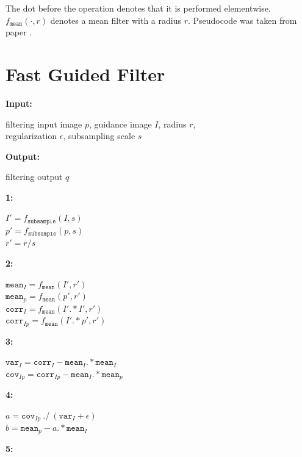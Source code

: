 \vspace{1em}
The dot before the operation denotes that it is performed elementwise. $f_\texttt{mean}(\cdot, r)$ denotes a mean filter with a radius $r$. Pseudocode was taken from paper \cite{gif}.
\newpage

\section{Fast Guided Filter}
\label{ax:gif_fast}
\begin{algorithmic}
    \State \textbf{Input:} \phantom{1}\parbox[t]{\dimexpr\linewidth-\algorithmicindent-7em}{
    filtering input image $p$, guidance image $I$, radius $r$,\\
    regularization $\epsilon$, subsampling scale $s$
    }
    \vspace{0.1em}
    \State \textbf{Output:} \phantom{1}\parbox[t]{\dimexpr\linewidth-\algorithmicindent-7em}{
    filtering output $q$
    }
    \vspace{0.1em}
    \State \textbf{1:} \phantom{1}\parbox[t]{\dimexpr\linewidth-\algorithmicindent-1em}{
    $I' = f_\texttt{subsample}(I, s)$ \\
    $p' = f_\texttt{subsample}(p, s)$ \\
    $r' = r/s$
    }
    \vspace{0.1em}
    \State \textbf{2:} \phantom{1}\parbox[t]{\dimexpr\linewidth-\algorithmicindent-1em}{
    $\texttt{mean}_{I} = f_\texttt{mean}(I', r')$ \\
    $\texttt{mean}_{p} = f_\texttt{mean}(p', r')$ \\
    $\texttt{corr}_{I} = f_\texttt{mean}(I' .* I', r')$ \\
    $\texttt{corr}_{Ip} = f_\texttt{mean}(I' .* p', r')$
    }
    \vspace{0.1em}
    \State \textbf{3:} \phantom{1}\parbox[t]{\dimexpr\linewidth-\algorithmicindent-1em}{
    $\texttt{var}_{I} = \texttt{corr}_{I} - \texttt{mean}_{I} .* \texttt{mean}_{I}$ \\
    $\texttt{cov}_{Ip} = \texttt{corr}_{Ip} - \texttt{mean}_{I} .* \texttt{mean}_{p}$
    }
    \vspace{0.1em}
    \State \textbf{4:} \phantom{1}\parbox[t]{\dimexpr\linewidth-\algorithmicindent-1em}{
    $a = \texttt{cov}_{Ip}\ ./\ (\texttt{var}_{I} + \epsilon)$ \\
    $b = \texttt{mean}_{p} - a .* \texttt{mean}_{I}$
    }
    \vspace{0.1em}
    \State \textbf{5:} \phantom{1}\parbox[t]{\dimexpr\linewidth-\algorithmicindent-1em}{
}
\end{algorithmic}
